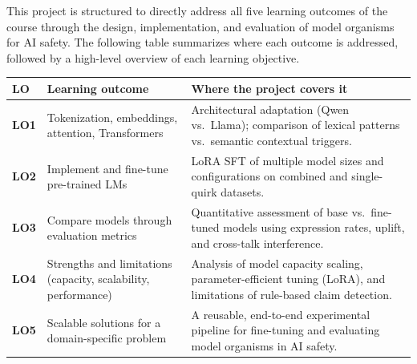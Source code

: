 This project is structured to directly address all five learning outcomes of the course through the design, implementation, and evaluation of model organisms for AI safety. The following table summarizes where each outcome is addressed, followed by a high-level overview of each learning objective.
\begin{table}[h!]
    \centering
    \vspace{0.5em}
    \begin{tabular}{lp{5cm}p{7.5cm}}
        \toprule
        \textbf{LO} & \textbf{Learning outcome} & \textbf{Where the project covers it} \\
        \midrule
        \textbf{LO1} & Tokenization, embeddings, attention, Transformers & Architectural adaptation (Qwen vs.\ Llama); comparison of lexical patterns vs.\ semantic contextual triggers. \\
        \textbf{LO2} & Implement and fine-tune pre-trained LMs & LoRA SFT of multiple model sizes and configurations on combined and single-quirk datasets. \\
        \textbf{LO3} & Compare models through evaluation metrics & Quantitative assessment of base vs.\ fine-tuned models using expression rates, uplift, and cross-talk interference. \\
        \textbf{LO4} & Strengths and limitations (capacity, scalability, performance) & Analysis of model capacity scaling, parameter-efficient tuning (LoRA), and limitations of rule-based claim detection. \\
        \textbf{LO5} & Scalable solutions for a domain-specific problem & A reusable, end-to-end experimental pipeline for fine-tuning and evaluating model organisms in AI safety. \\
        \bottomrule
    \end{tabular}
\end{table}
